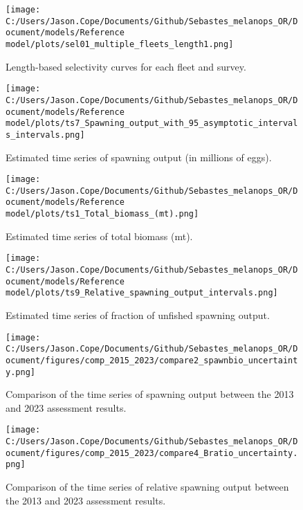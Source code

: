 \documentclass[11pt,
  english,
  letterpaper,
]{article}
\begin{document}
\begin{figure}
\centering
\texttt{[image: C:/Users/Jason.Cope/Documents/Github/Sebastes\_melanops\_OR/Document/models/Reference model/plots/sel01\_multiple\_fleets\_length1.png]}
\caption{Length-based selectivity curves for each fleet and survey.\label{fig:fleet_selectivity}}
\end{figure}

\begin{figure}
\centering
\texttt{[image: C:/Users/Jason.Cope/Documents/Github/Sebastes\_melanops\_OR/Document/models/Reference model/plots/ts7\_Spawning\_output\_with\_95\_asymptotic\_intervals\_intervals.png]}
\caption{Estimated time series of spawning output (in millions of eggs).\label{fig:ssb}}
\end{figure}

\begin{figure}
\centering
\texttt{[image: C:/Users/Jason.Cope/Documents/Github/Sebastes\_melanops\_OR/Document/models/Reference model/plots/ts1\_Total\_biomass\_(mt).png]}
\caption{Estimated time series of total biomass (mt).\label{fig:tot-bio}}
\end{figure}

\begin{figure}
\centering
\texttt{[image: C:/Users/Jason.Cope/Documents/Github/Sebastes\_melanops\_OR/Document/models/Reference model/plots/ts9\_Relative\_spawning\_output\_intervals.png]}
\caption{Estimated time series of fraction of unfished spawning output.\label{fig:depl}}
\end{figure}

\begin{figure}
\centering
\texttt{[image: C:/Users/Jason.Cope/Documents/Github/Sebastes\_melanops\_OR/Document/figures/comp\_2015\_2023/compare2\_spawnbio\_uncertainty.png]}
\caption{Comparison of the time series of spawning output between the 2013 and 2023 assessment results.\label{fig:comp_ssb}}
\end{figure}

\begin{figure}
\centering
\texttt{[image: C:/Users/Jason.Cope/Documents/Github/Sebastes\_melanops\_OR/Document/figures/comp\_2015\_2023/compare4\_Bratio\_uncertainty.png]}
\caption{Comparison of the time series of relative spawning output between the 2013 and 2023 assessment results.\label{fig:comp_depl}}
\end{figure}
\end{document}
